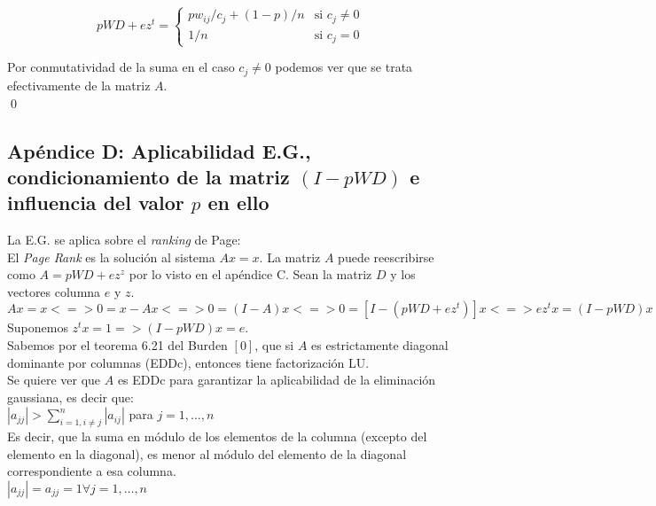 		\[
			        pWD+ez^{t} = 	\begin{cases}
							pw_{ij}/c_j+(1-p)/n & \text{si } c_{j} \neq 0 \\
								     1   /n & \text{si } c_{j}   =  0
						\end  {cases}
		\]

		Por conmutatividad de la suma en el caso $c_j \neq 0$ podemos ver que se trata efectivamente de la matriz $A$. \\

		\qed

	\clearpage

	\subsection{Apéndice D: Aplicabilidad E.G., condicionamiento de la matriz $(I-pWD)$ e influencia del valor $p$ en ello}

		La E.G. se aplica sobre el \textit{ranking} de Page: \\

		El \textit{Page Rank} es la solución al sistema $Ax=x$. La matriz $A$ puede reescribirse como $A=pWD+ez^{z}$ por lo visto en el apéndice C. Sean la matriz $D$ y los vectores columna $e$ y $z$. \\

		$Ax=x <=> 0 = x-Ax <=> 0 = (I-A)x <=> 0 = [I - (pWD+ez^{t})]x <=> ez^{t}x = (I-pWD)x$ \\

		Suponemos $z^{t}x = 1 => (I-pWD)x = e$. \\

		Sabemos por el teorema 6.21 del Burden $[0]$, que si $A$ es estrictamente diagonal dominante por columnas (EDDc), entonces tiene factorización LU. \\ %

		Se quiere ver que $A$ es EDDc para garantizar la aplicabilidad de la eliminación gaussiana, es decir que: \\

		$|a_{jj}| > \sum^{n}_{i=1, i \neq j} |a_{ij}|$ para $j = 1, \hdots, n$ \\

		Es decir, que la suma en módulo de los elementos de la columna (excepto del elemento en la diagonal), es menor al módulo del elemento de la diagonal correspondiente a esa columna. \\

		$|a_{jj}| = a_{jj} = 1 \forall j = 1, \hdots, n$ \\

